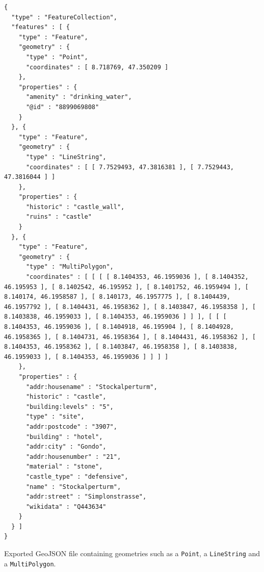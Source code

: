 \begin{verbatim}
{
  "type" : "FeatureCollection",
  "features" : [ {
    "type" : "Feature",
    "geometry" : {
      "type" : "Point",
      "coordinates" : [ 8.718769, 47.350209 ]
    },
    "properties" : {
      "amenity" : "drinking_water",
      "@id" : "8899069808"
    }
  }, {
    "type" : "Feature",
    "geometry" : {
      "type" : "LineString",
      "coordinates" : [ [ 7.7529493, 47.3816381 ], [ 7.7529443, 47.3816044 ] ]
    },
    "properties" : {
      "historic" : "castle_wall",
      "ruins" : "castle"
    }
  }, {
    "type" : "Feature",
    "geometry" : {
      "type" : "MultiPolygon",
      "coordinates" : [ [ [ [ 8.1404353, 46.1959036 ], [ 8.1404352, 46.195953 ], [ 8.1402542, 46.195952 ], [ 8.1401752, 46.1959494 ], [ 8.140174, 46.1958587 ], [ 8.140173, 46.1957775 ], [ 8.1404439, 46.1957792 ], [ 8.1404431, 46.1958362 ], [ 8.1403847, 46.1958358 ], [ 8.1403838, 46.1959033 ], [ 8.1404353, 46.1959036 ] ] ], [ [ [ 8.1404353, 46.1959036 ], [ 8.1404918, 46.195904 ], [ 8.1404928, 46.1958365 ], [ 8.1404731, 46.1958364 ], [ 8.1404431, 46.1958362 ], [ 8.1404353, 46.1958362 ], [ 8.1403847, 46.1958358 ], [ 8.1403838, 46.1959033 ], [ 8.1404353, 46.1959036 ] ] ] ]
    },
    "properties" : {
      "addr:housename" : "Stockalperturm",
      "historic" : "castle",
      "building:levels" : "5",
      "type" : "site",
      "addr:postcode" : "3907",
      "building" : "hotel",
      "addr:city" : "Gondo",
      "addr:housenumber" : "21",
      "material" : "stone",
      "castle_type" : "defensive",
      "name" : "Stockalperturm",
      "addr:street" : "Simplonstrasse",
      "wikidata" : "Q443634"
    }
  } ]
}
\end{verbatim}
Exported GeoJSON file containing geometries such as a \texttt{Point}, a \texttt{LineString}  and a \texttt{MultiPolygon}.
